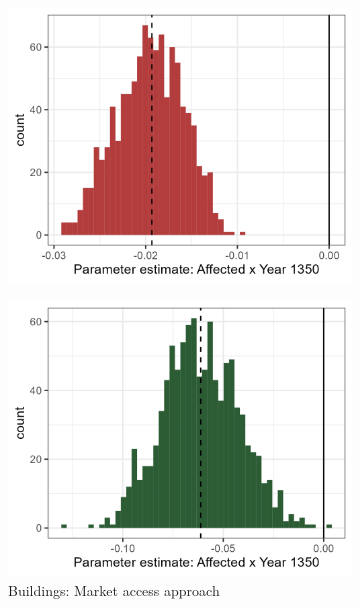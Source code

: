 \documentclass[11pt]{article}
\begin{document}
\begin{figure}[h!]
\begin{subfigure}[b]{0.45\textwidth}
        \includegraphics[width=\textwidth]{Plots/Regression_plots/arch_dummy_coins_boot.png}
    \end{subfigure}
    \vspace{0.45cm}
    \begin{subfigure}[b]{0.45\textwidth}
        \centering
        \caption{\label{fig:distri_c} Buildings: Market access approach}
        \includegraphics[width=\textwidth]{Plots/Regression_plots/arch_MA_buildings_boot.png}
    \end{subfigure}
    \hfill
    \begin{subfigure}[b]{0.45\textwidth}

\end{subfigure}
\end{figure}
\end{document}
